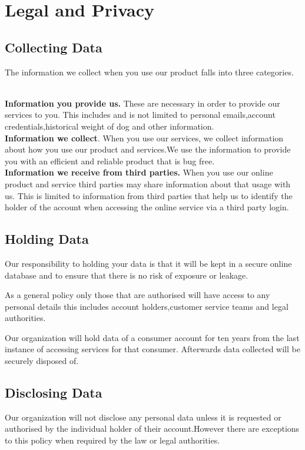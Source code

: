 \section{Legal and Privacy}


\subsection{Collecting Data}
The information we collect when you use our product falls into three categories. 

\\
\textbf{Information you provide us.}
These are necessary in order to provide our services to you. This includes and is not limited to personal emails,account credentials,historical weight of dog and other information.
\\
\textbf{Information we collect}.
When you use our services, we collect information about how you use our product and services.We use the information to provide you with an efficient and reliable product that is bug free.
\\
\textbf{Information we receive from third parties.}
When you use our online product and service third parties may share information about that usage with us. This is limited to information from third parties that help us to identify the holder of the account when accessing the online service via a third party login.

\subsection{Holding Data}
Our responsibility to holding your data is that it will be kept in a secure online database and to ensure that there is no risk of exposure or leakage. 

As a general policy only those that are authorised will have access to any personal details this includes account holders,customer service teams and legal authorities.

Our organization will hold data of a consumer account for ten years from the last instance of accessing services for that consumer. Afterwards data collected will be securely disposed of.

\subsection{Disclosing Data}
Our organization will not disclose any personal data unless it is requested or authorised by the individual holder of their account.However there are exceptions to this policy when required by the law or legal authorities.

